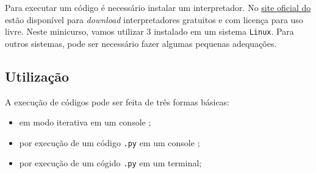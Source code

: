 \documentclass[12pt]{article}
\begin{document}
Para executar um código {\python} é necessário instalar um interpretador. No \href{https://www.python.org/}{site oficial do \python} estão disponível para {\it download} interpretadores gratuitos e com licença para uso livre. Neste minicurso, vamos utilizar {\python} 3 instalado em um sistema \verb+Linux+. Para outros sistemas, pode ser necessário fazer algumas pequenas adequações.

\subsection{Utilização}

A execução de códigos \python pode ser feita de três formas básicas:
\begin{itemize}
\item em modo iterativa em um console \python;
\item por execução de um código \verb+.py+ em um console \python;
\item por execução de um cógido \verb+.py+ em um terminal;
\end{itemize}
\end{document}
